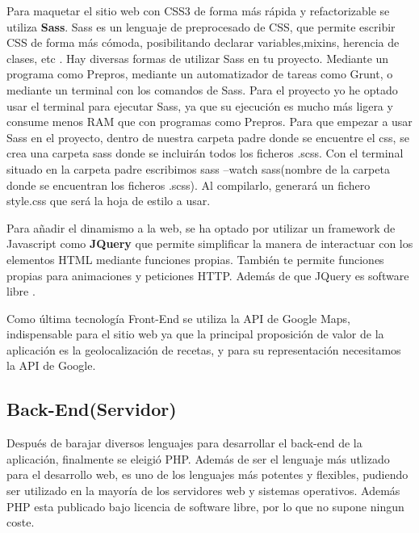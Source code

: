 \vspace{5 mm}

Para maquetar el sitio web con CSS3 de forma más rápida y refactorizable se utiliza \textbf{Sass}. Sass es un lenguaje de preprocesado de CSS, que permite escribir CSS de forma más cómoda, posibilitando declarar variables,mixins, herencia de clases, etc \cite{sass-doc}. Hay diversas formas de utilizar Sass en tu proyecto. Mediante un programa como Prepros, mediante un automatizador de tareas como Grunt, o mediante un terminal con los comandos de Sass. Para el proyecto yo he optado usar el terminal para ejecutar Sass, ya que su ejecución es mucho más ligera y consume menos RAM que con programas como Prepros. Para que empezar a usar Sass en el proyecto, dentro de nuestra carpeta padre donde se encuentre el css, se crea una carpeta sass donde se incluirán todos los ficheros .scss. Con el terminal situado en la carpeta padre escribimos sass --watch sass(nombre de la carpeta donde se encuentran los ficheros .scss). Al compilarlo, generará un fichero style.css que será la hoja de estilo a usar.

\vspace{5 mm}

Para añadir el dinamismo a la web, se ha optado por utilizar un framework de Javascript como \textbf{JQuery} que permite simplificar la manera de interactuar con los elementos HTML mediante funciones propias. También te permite funciones propias para animaciones y peticiones HTTP. Además de que JQuery es software libre \cite{jquery-doc}.

\vspace{5 mm}

Como última tecnología Front-End se utiliza la API de Google Maps, indispensable para el sitio web ya que la principal proposición de valor de la aplicación es la geolocalización de recetas, y para su representación necesitamos la API de Google.


\subsection{Back-End(Servidor)}

Después de barajar diversos lenguajes para desarrollar el back-end de la aplicación, finalmente se eleigió PHP. Además de ser el lenguaje más utlizado para el desarrollo web, es uno de los lenguajes más potentes y flexibles, pudiendo ser utilizado en la mayoría de los servidores web y sistemas operativos. Además PHP esta publicado bajo licencia de software libre, por lo que no supone ningun coste.



